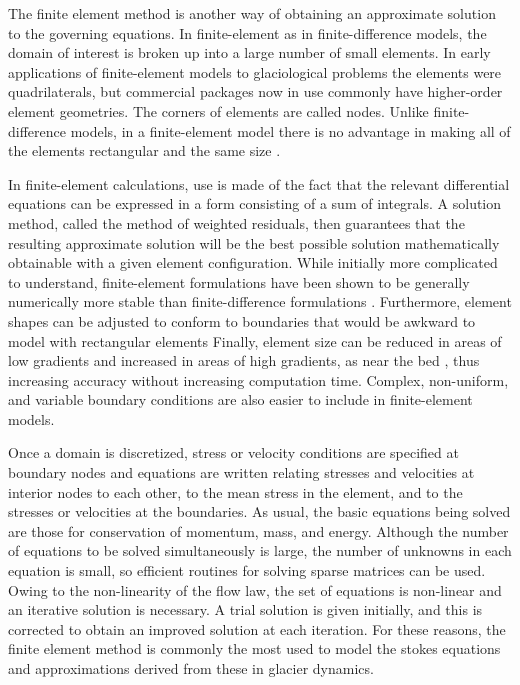 \documentclass{article}
\begin{document}
The ﬁnite element method is another way of obtaining an approximate solution to
the governing equations. In ﬁnite-element as in ﬁnite-difference models, the
domain of interest is broken up into a large number of small elements. In early
applications of ﬁnite-element models to glaciological problems the elements were
quadrilaterals, but commercial packages now in use commonly have higher-order
element geometries. The corners of elements are called nodes. Unlike ﬁnite-
difference models, in a ﬁnite-element model there is no advantage in making all
of the elements rectangular and the same size \cite{hooke2019principles}.

In ﬁnite-element calculations, use is made of the fact
that the relevant differential equations can be expressed in a form consisting of a sum of integrals. A solution method, called the method of weighted residuals, then guarantees that the resulting approximate solution will be the best possible solution mathematically obtainable with a given element configuration. While initially more complicated to understand, ﬁnite-element formulations have been shown to be generally numerically more stable than ﬁnite-difference formulations \cite{hooke2019principles}. Furthermore, element shapes can be adjusted to conform to boundaries that would be awkward to model with rectangular elements Finally, element size can be reduced in areas of low gradients and increased in areas of high gradients, as near the bed , thus increasing accuracy without increasing computation time. Complex, non-uniform, and variable boundary conditions are also easier to include in ﬁnite-element models.

Once a domain is discretized, stress or velocity conditions are specified at boundary nodes and equations are written relating stresses and velocities at interior nodes to each other, to the mean stress in the element, and to the stresses or velocities at the boundaries. As usual, the basic equations being solved are those for conservation of momentum, mass, and energy. Although the number of equations to be solved simultaneously is large, the number of unknowns in each equation is small, so efficient routines for solving sparse matrices can be used. Owing to the non-linearity of the ﬂow law, the set of equations is non-linear and an iterative solution is necessary. A trial solution is given initially, and this is corrected to obtain an improved solution at each iteration. For these reasons, the finite element method is commonly the most used to model the stokes equations and approximations derived from these in glacier dynamics. 
\end{document}
